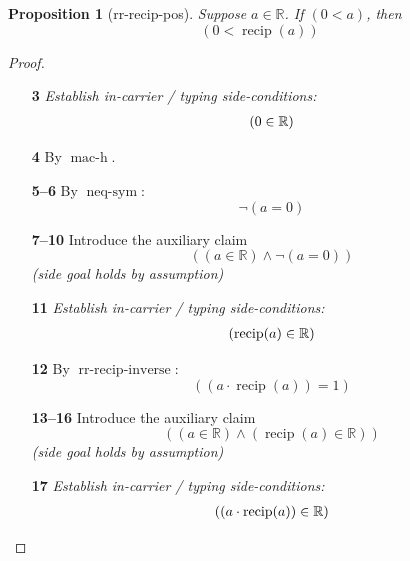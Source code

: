 \documentclass[11pt]{article}
\theoremstyle{plain}
\newtheorem{proposition}{Proposition}
\begin{document}
\begin{proposition}[rr-recip-pos]
Suppose $a \in \mathbb{R}$. If $(0 < a)$, then 
\begin{equation*}
(0 < \operatorname{recip}(a))
\end{equation*}

\end{proposition}

\begin{proof}
\begin{itemize}[leftmargin=2.8em, itemsep=4pt, parsep=1pt]
  \item[\textbf{3}] \emph{Establish in-carrier / typing side-conditions:}
\begin{equation*}
\begin{array}{@{}l@{}}
(0 \in \mathbb{R})
\end{array}
\end{equation*}

  \item[\textbf{4}] By $\operatorname{mac\text{-}h}$.
  \item[\textbf{5--6}] By $\operatorname{neq\text{-}sym}$:
\begin{equation*}
\neg (a = 0)
\end{equation*}

  \item[\textbf{7--10}] Introduce the auxiliary claim
\begin{equation*}
((a \in \mathbb{R}) \wedge \neg (a = 0))
\end{equation*}
  \emph{(side goal holds by assumption)}
  \item[\textbf{11}] \emph{Establish in-carrier / typing side-conditions:}
\begin{equation*}
\begin{array}{@{}l@{}}
(\operatorname{recip}(a) \in \mathbb{R})
\end{array}
\end{equation*}

  \item[\textbf{12}] By $\operatorname{rr\text{-}recip\text{-}inverse}$:
\begin{equation*}
((a \cdot \operatorname{recip}(a)) = 1)
\end{equation*}

  \item[\textbf{13--16}] Introduce the auxiliary claim
\begin{equation*}
((a \in \mathbb{R}) \wedge (\operatorname{recip}(a) \in \mathbb{R}))
\end{equation*}
  \emph{(side goal holds by assumption)}
  \item[\textbf{17}] \emph{Establish in-carrier / typing side-conditions:}
\begin{equation*}
\begin{array}{@{}l@{}}
((a \cdot \operatorname{recip}(a)) \in \mathbb{R})
\end{array}
\end{equation*}


\end{itemize}
\end{proof}
\end{document}
